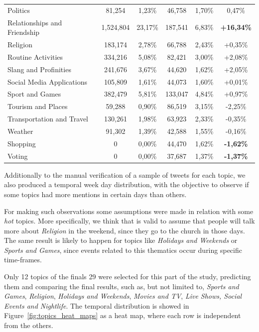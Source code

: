 \begin{table}[ht]
{\begin{tabular}{l|cc|cc|c}
Politics & 81,254 & 1,23\% & 46,758 & 1,70\% & 0,47\% \\
Relationships and Friendship & 1,524,804 & 23,17\% & 187,541 & 6,83\% & \textbf{+16,34\%} \\
Religion & 183,174 & 2,78\% & 66,788 & 2,43\% & +0,35\% \\
Routine Activities & 334,216 & 5,08\% & 82,421 & 3,00\% & +2,08\% \\
Slang and Profinities & 241,676 & 3,67\% & 44,620 & 1,62\% & +2,05\% \\
Social Media Applications & 105,809 & 1,61\% & 44,073 & 1,60\% & +0,01\% \\
Sport and Games & 382,479 & 5,81\% & 133,047 & 4,84\% & +0,97\% \\
Tourism and Places & 59,288 & 0,90\% & 86,519 & 3,15\% & -2,25\% \\
Transportation and Travel & 130,261 & 1,98\% & 63,923 & 2,33\% & -0,35\% \\
Weather & 91,302 & 1,39\% & 42,588 & 1,55\% & -0,16\% \\
Shopping & 0 & 0,00\% & 44,470 & 1,62\% & \textbf{-1,62\%} \\
Voting & 0 & 0,00\% & 37,687 & 1,37\% & \textbf{-1,37\%} \\ \hline
\end{tabular}}
\end{table}

Additionally to the manual verification of a sample of tweets for each topic, we also produced a temporal week day distribution,  with the objective to observe if some topics had more mentions in certain days than others.

For making such observations some assumptions were made in relation with some \textit{hot} topics. More specifically, we think that is valid to assume that people will talk more about \textit{Religion} in the weekend, since they go to the church in those days. The same result is likely to happen for topics like \textit{Holidays and Weekends} or \textit{Sports and Games}, since events related to this thematics occur during specific time-frames. 

Only 12 topics of the finals 29 were selected for this part of the study, predicting them and comparing the final results, such as, but not limited to, \textit{Sports and Games}, \textit{Religion}, \textit{Holidays and Weekends}, \textit{Movies and TV}, \textit{Live Shows, Social Events and Nightlife}. The temporal distribution is showed in Figure~\ref{fig:topics_heat_maps} as a heat map, where each row is independent from the others.

